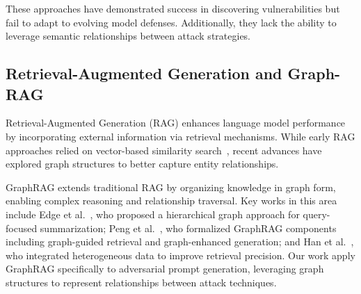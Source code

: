 These approaches have demonstrated success in discovering vulnerabilities but fail to adapt to evolving model defenses. Additionally, they lack the ability to leverage semantic relationships between attack strategies.

\subsection{Retrieval-Augmented Generation and Graph-RAG}

Retrieval-Augmented Generation (RAG) enhances language model performance by incorporating external information via retrieval mechanisms. While early RAG approaches relied on vector-based similarity search~\cite{lewis2020retrieval}, recent advances have explored graph structures to better capture entity relationships.

GraphRAG extends traditional RAG by organizing knowledge in graph form, enabling complex reasoning and relationship traversal. Key works in this area include Edge et al.~\cite{edge2024local}, who proposed a hierarchical graph approach for query-focused summarization; Peng et al.~\cite{peng2024graph}, who formalized GraphRAG components including graph-guided retrieval and graph-enhanced generation; and Han et al.~\cite{han2024retrieval}, who integrated heterogeneous data to improve retrieval precision. Our work apply GraphRAG specifically to adversarial prompt generation, leveraging graph structures to represent relationships between attack techniques.
